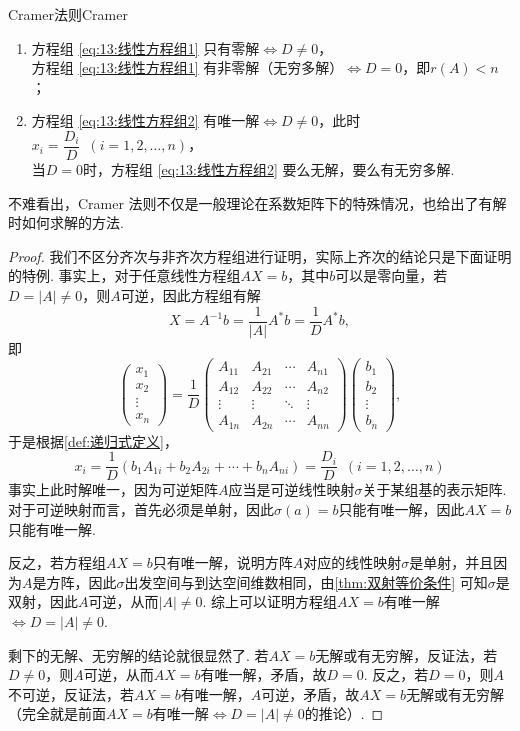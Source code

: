 \begin{theorem}{Cramer法则}{Cramer}
    \begin{enumerate}
        \item 方程组 \ref{eq:13:线性方程组1} 只有零解$\iff D \neq 0$，\\
              方程组 \ref{eq:13:线性方程组1} 有非零解（无穷多解）$\iff D=0$，即$r(A)<n$；

        \item 方程组 \ref{eq:13:线性方程组2} 有唯一解$\iff D \neq 0$，此时$x_i=\dfrac{D_i}{D}\enspace(i=1,2,\ldots,n)$，\\
              当$D=0$时，方程组 \ref{eq:13:线性方程组2} 要么无解，要么有无穷多解.
    \end{enumerate}
\end{theorem}

不难看出，Cramer 法则不仅是一般理论在系数矩阵下的特殊情况，也给出了有解时如何求解的方法.

\begin{proof}
    我们不区分齐次与非齐次方程组进行证明，实际上齐次的结论只是下面证明的特例. 事实上，对于任意线性方程组$AX=b$，其中$b$可以是零向量，若$D=|A|\neq 0$，则$A$可逆，因此方程组有解
    \[X=A^{-1}b=\frac{1}{|A|}A^*b=\frac{1}{D}A^*b,\]
    即
    \[\begin{pmatrix}
            x_1 \\ x_2 \\ \vdots \\ x_n
        \end{pmatrix}= \dfrac{1}{D}\begin{pmatrix}
            A_{11} & A_{21} & \cdots & A_{n1} \\
            A_{12} & A_{22} & \cdots & A_{n2} \\
            \vdots & \vdots & \ddots & \vdots \\
            A_{1n} & A_{2n} & \cdots & A_{nn}
        \end{pmatrix}\begin{pmatrix}
            b_1 \\ b_2 \\ \vdots \\ b_n
        \end{pmatrix},\]
    于是根据\autoref{def:递归式定义}，
    \[x_i=\frac{1}{D}(b_1A_{1i}+b_2A_{2i}+\cdots+b_nA_{ni})=\frac{D_i}{D}\enspace(i=1,2,\ldots,n)\]
    事实上此时解唯一，因为可逆矩阵$A$应当是可逆线性映射$\sigma$关于某组基的表示矩阵. 对于可逆映射而言，首先必须是单射，因此$\sigma(a)=b$只能有唯一解，因此$AX=b$只能有唯一解.

    反之，若方程组$AX=b$只有唯一解，说明方阵$A$对应的线性映射$\sigma$是单射，并且因为$A$是方阵，因此$\sigma$出发空间与到达空间维数相同，由\autoref{thm:双射等价条件} 可知$\sigma$是双射，因此$A$可逆，从而$|A|\neq 0$. 综上可以证明方程组$AX=b$有唯一解$\iff D=|A|\neq 0$.

    剩下的无解、无穷解的结论就很显然了. 若$AX=b$无解或有无穷解，反证法，若$D\neq 0$，则$A$可逆，从而$AX=b$有唯一解，矛盾，故$D=0$. 反之，若$D=0$，则$A$不可逆，反证法，若$AX=b$有唯一解，$A$可逆，矛盾，故$AX=b$无解或有无穷解（完全就是前面$AX=b$有唯一解$\iff D=|A|\neq 0$的推论）.
\end{proof}


